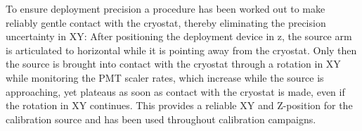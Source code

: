 To ensure deployment precision a procedure has been worked out to make reliably gentle contact with the cryostat, thereby eliminating the precision uncertainty in XY: After positioning the deployment device in z, the source arm is articulated to horizontal while it is pointing away from the cryostat. Only then the source is brought into contact with the cryostat through a rotation in XY while monitoring the PMT scaler rates, which increase while the source is approaching, yet plateaus as soon as contact with the cryostat is made, even if the rotation in XY continues. This provides a reliable XY and Z-position for the calibration source and has been used throughout calibration campaigns.